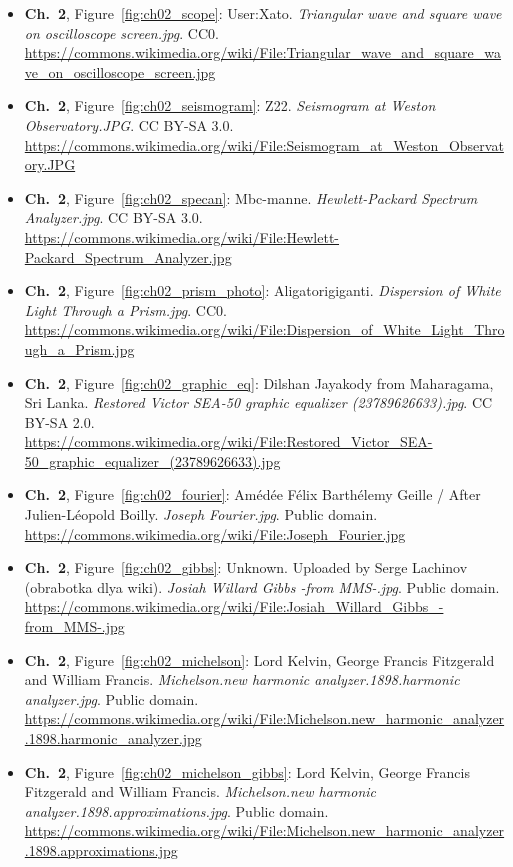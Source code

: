 \begin{small}
\begin{itemize}[leftmargin=0pt,itemsep=2pt,label={}]
\item \textbf{Ch.~2}, Figure~\ref{fig:ch02_scope}: User:Xato. \emph{Triangular wave and square wave on oscilloscope screen.\allowbreak{}jpg}. CC0. \url{https://commons.wikimedia.org/wiki/File:Triangular_wave_and_square_wave_on_oscilloscope_screen.jpg}
\item \textbf{Ch.~2}, Figure~\ref{fig:ch02_seismogram}: Z22. \emph{Seismogram at Weston Observatory.\allowbreak{}JPG}. CC BY-SA 3.0. \url{https://commons.wikimedia.org/wiki/File:Seismogram_at_Weston_Observatory.JPG}
\item \textbf{Ch.~2}, Figure~\ref{fig:ch02_specan}: Mbc-manne. \emph{Hewlett-\allowbreak{}Packard Spectrum Analyzer.\allowbreak{}jpg}. CC BY-SA 3.0. \url{https://commons.wikimedia.org/wiki/File:Hewlett-Packard_Spectrum_Analyzer.jpg}
\item \textbf{Ch.~2}, Figure~\ref{fig:ch02_prism_photo}: Aligatorigiganti. \emph{Dispersion of White Light Through a Prism.\allowbreak{}jpg}. CC0. \url{https://commons.wikimedia.org/wiki/File:Dispersion_of_White_Light_Through_a_Prism.jpg}
\item \textbf{Ch.~2}, Figure~\ref{fig:ch02_graphic_eq}: Dilshan Jayakody from Maharagama, Sri Lanka. \emph{Restored Victor SEA-\allowbreak{}50 graphic equalizer (23789626633).\allowbreak{}jpg}. CC BY-SA 2.0. \url{https://commons.wikimedia.org/wiki/File:Restored_Victor_SEA-50_graphic_equalizer_(23789626633).jpg}
\item \textbf{Ch.~2}, Figure~\ref{fig:ch02_fourier}: Amédée Félix Barthélemy Geille / After Julien-Léopold Boilly. \emph{Joseph Fourier.\allowbreak{}jpg}. Public domain. \url{https://commons.wikimedia.org/wiki/File:Joseph_Fourier.jpg}
\item \textbf{Ch.~2}, Figure~\ref{fig:ch02_gibbs}: Unknown. Uploaded by Serge Lachinov (obrabotka dlya wiki). \emph{Josiah Willard Gibbs -\allowbreak{}from MMS-\allowbreak{}.\allowbreak{}jpg}. Public domain. \url{https://commons.wikimedia.org/wiki/File:Josiah_Willard_Gibbs_-from_MMS-.jpg}
\item \textbf{Ch.~2}, Figure~\ref{fig:ch02_michelson}: Lord Kelvin, George Francis Fitzgerald and William Francis. \emph{Michelson.\allowbreak{}new harmonic analyzer.\allowbreak{}1898.\allowbreak{}harmonic analyzer.\allowbreak{}jpg}. Public domain. \url{https://commons.wikimedia.org/wiki/File:Michelson.new_harmonic_analyzer.1898.harmonic_analyzer.jpg}
\item \textbf{Ch.~2}, Figure~\ref{fig:ch02_michelson_gibbs}: Lord Kelvin, George Francis Fitzgerald and William Francis. \emph{Michelson.\allowbreak{}new harmonic analyzer.\allowbreak{}1898.\allowbreak{}approximations.\allowbreak{}jpg}. Public domain. \url{https://commons.wikimedia.org/wiki/File:Michelson.new_harmonic_analyzer.1898.approximations.jpg}

\end{itemize}
\end{small}
